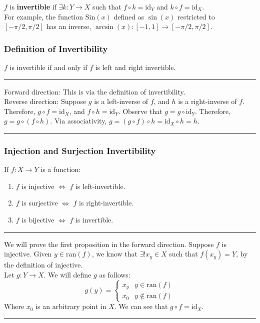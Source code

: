 \documentclass[10pt]{extarticle}
\begin{document}
      $f$ is \textbf{invertible} if $\exists k:Y\rightarrow X$ such that $f\circ k = \text{id}_Y$ and $k\circ f = \text{id}_X$.\\

      For example, the function $\text{Sin}(x)$ defined as $\sin(x)$ restricted to $[-\pi/2,\pi/2]$ has an inverse, $\arcsin(x):[-1,1] \rightarrow [-\pi/2,\pi/2]$.
      \subsubsection{Definition of Invertibility}%
    $f$ is invertible if and only if $f$ is left and right invertible.\\
    \vspace{4pt}
    \rule{\textwidth}{0.4pt}
    \vspace{4pt}
      Forward direction: This is via the definition of invertibility.\\

      Reverse direction: Suppose $g$ is a left-inverse of $f$, and $h$ is a right-inverse of $f$. Therefore, $g\circ f = \text{id}_X$, and $f\circ h = \text{id}_Y$. Observe that $g = g\circ \text{id}_Y$. Therefore, $g = g\circ(f\circ h)$. Via associativity, $g = (g\circ f)\circ h = \text{id}_X \circ h = h$.\\
      \vspace{4pt}
      \rule{\textwidth}{0.4pt}
      \subsubsection{Injection and Surjection Invertibility}%
    If $f:X\rightarrow Y$ is a function:
    \begin{enumerate}
      \item $f$ is injective $\Leftrightarrow$ $f$ is left-invertible.
      \item $f$ is surjective $\Leftrightarrow$ $f$ is right-invertible.
      \item $f$ is bijective $\Leftrightarrow$ $f$ is invertible.
    \end{enumerate}
    \vspace{4pt}
    \rule{\textwidth}{0.4pt}
    \vspace{4pt}
    We will prove the first proposition in the forward direction. Suppose $f$ is injective. Given $y\in \text{ran}(f)$, we know that $\exists! x_y\in X$ such that $f(x_y) = Y$, by the definition of injective.\\

    Let $g:Y\rightarrow X$. We will define $g$ as follows:
    \[
      g(y) = \begin{cases}
        x_y & y\in \text{ran}(f) \\
        x_0 & y\notin \text{ran}(f)
      \end{cases}
    \] 
    Where $x_0$ is an arbitrary point in $X$. We can see that $g\circ f = \text{id}_X$.\\
    \vspace{4pt}
    \rule{\textwidth}{0.4pt}
    \vspace{4pt}
\end{document}
